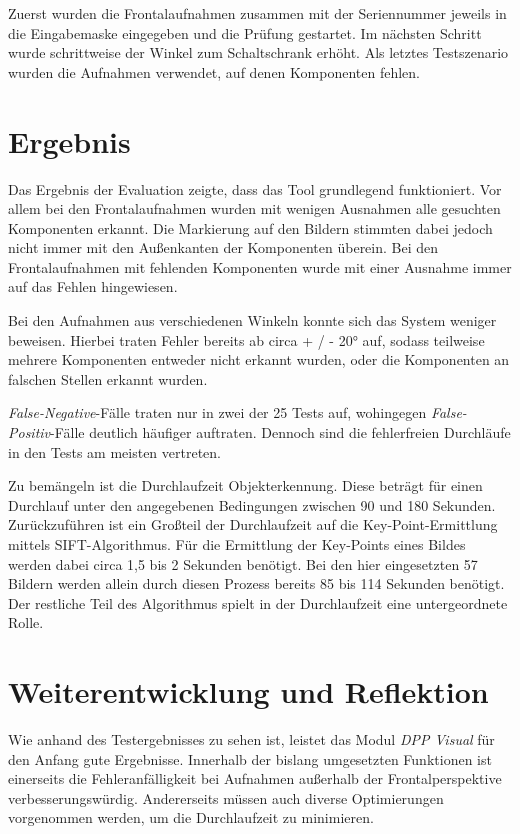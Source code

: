 \documentclass[
    type=Projektarbeit,
    status=draft, %
    language=german, %
    bibengine=bibtex,
]{unibwm-inf-thesis}
\begin{document}
    Zuerst wurden die Frontalaufnahmen zusammen mit der Seriennummer jeweils in die Eingabemaske eingegeben und die Prüfung gestartet.
    Im nächsten Schritt wurde schrittweise der Winkel zum Schaltschrank erhöht.
    Als letztes Testszenario wurden die Aufnahmen verwendet, auf denen Komponenten fehlen.

    \section{Ergebnis}
    Das Ergebnis der Evaluation zeigte, dass das Tool grundlegend funktioniert.
    Vor allem bei den Frontalaufnahmen wurden mit wenigen Ausnahmen alle gesuchten Komponenten erkannt.
    Die Markierung auf den Bildern stimmten dabei jedoch nicht immer mit den Außenkanten der Komponenten überein.
    Bei den Frontalaufnahmen mit fehlenden Komponenten wurde mit einer Ausnahme immer auf das Fehlen hingewiesen.

    Bei den Aufnahmen aus verschiedenen Winkeln konnte sich das System weniger beweisen.
    Hierbei traten Fehler bereits ab circa + / - 20° auf, sodass teilweise mehrere Komponenten entweder nicht erkannt wurden, oder die Komponenten an falschen Stellen erkannt wurden.

    \textit{False-Negative}-Fälle traten nur in zwei der 25 Tests auf, wohingegen \textit{False-Positiv}-Fälle deutlich häufiger auftraten.
    Dennoch sind die fehlerfreien Durchläufe in den Tests am meisten vertreten.

    Zu bemängeln ist die Durchlaufzeit Objekterkennung.
    Diese beträgt für einen Durchlauf unter den angegebenen Bedingungen zwischen 90 und 180 Sekunden.
    Zurückzuführen ist ein Großteil der Durchlaufzeit auf die Key-Point-Ermittlung mittels SIFT-Algorithmus.
    Für die Ermittlung der Key-Points eines Bildes werden dabei circa 1,5 bis 2 Sekunden benötigt.
    Bei den hier eingesetzten 57 Bildern werden allein durch diesen Prozess bereits 85 bis 114 Sekunden benötigt.
    Der restliche Teil des Algorithmus spielt in der Durchlaufzeit eine untergeordnete Rolle.


    \section{Weiterentwicklung und Reflektion}
    Wie anhand des Testergebnisses zu sehen ist, leistet das Modul \textit{DPP Visual} für den Anfang gute Ergebnisse.
    Innerhalb der bislang umgesetzten Funktionen ist einerseits die Fehleranfälligkeit bei Aufnahmen außerhalb der Frontalperspektive verbesserungswürdig.
    Andererseits müssen auch diverse Optimierungen vorgenommen werden, um die Durchlaufzeit zu minimieren.
\end{document}
